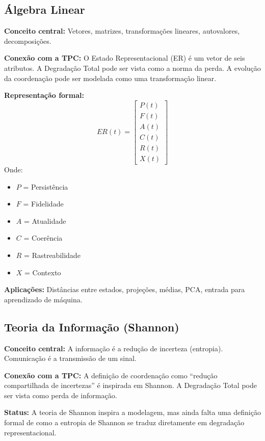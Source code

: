 \documentclass[12pt,a4paper]{article}
\begin{document}
\subsection{Álgebra Linear}

\textbf{Conceito central:} Vetores, matrizes, transformações lineares, autovalores, decomposições.

\textbf{Conexão com a TPC:}
O Estado Representacional (ER) é um vetor de seis atributos. A Degradação Total pode ser vista como a norma da perda. A evolução da coordenação pode ser modelada como uma transformação linear.

\textbf{Representação formal:}
\[
ER(t) =
\begin{bmatrix}
P(t) \\
F(t) \\
A(t) \\
C(t) \\
R(t) \\
X(t)
\end{bmatrix}
\]
Onde:
\begin{itemize}
    \item \(P\) = Persistência
    \item \(F\) = Fidelidade
    \item \(A\) = Atualidade
    \item \(C\) = Coerência
    \item \(R\) = Rastreabilidade
    \item \(X\) = Contexto
\end{itemize}

\textbf{Aplicações:} Distâncias entre estados, projeções, médias, PCA, entrada para aprendizado de máquina.

\subsection{Teoria da Informação (Shannon)}

\textbf{Conceito central:} A informação é a redução de incerteza (entropia). Comunicação é a transmissão de um sinal.

\textbf{Conexão com a TPC:}
A definição de coordenação como ``redução compartilhada de incertezas'' é inspirada em Shannon. A Degradação Total pode ser vista como perda de informação.

\textbf{Status:} A teoria de Shannon inspira a modelagem, mas ainda falta uma definição formal de como a entropia de Shannon se traduz diretamente em degradação representacional.
\end{document}
